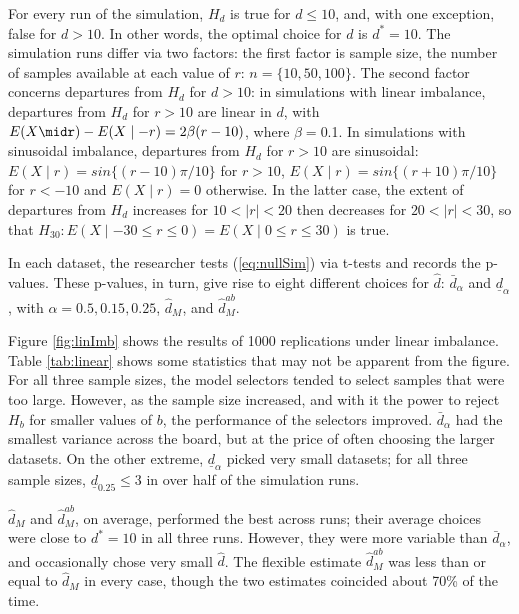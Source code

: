 \documentclass[lineno]{biometrika}\usepackage[]{graphicx}\usepackage[]{color}
\newcommand{\dalphaU}{\bar{d}_\alpha}
\newcommand{\dalphaB}{\underline{d}_\alpha}
\newcommand{\dstar}{d^*}
\newcommand{\dhatB}{\underline{d}}
\newcommand{\dhatm}{\hat{d}_M}
\newcommand{\dhatmab}{\hat{d}^{ab}_M}
\newcommand{\EE}{E}
\begin{document}
For every run of the simulation, $H_d$ is true for $d\le 10$, and,
with one exception, false for $d>10$.
In other words, the optimal choice for $d$ is $\dstar=10$.
The simulation runs differ via two factors: the first factor is sample
size, the number of samples available at each value of $r$:
$n=\{10,50,100\}$.
The second factor concerns departures from $H_d$ for $d>10$: in simulations with
linear imbalance, departures from $H_d$ for $r>10$ are linear in $d$, with $\EE
(X\midr)-\EE(X\mid-r)=2\beta(r-10)$, where $\beta=$0.1.
In simulations with sinusoidal imbalance, departures from $H_d$ for
$r>10$ are sinusoidal: $\EE(X\mid r) = sin\{(r-10)\pi/10\}$ for
$r>10$, $\EE(X\mid r)= sin\{(r+10)\pi/10\}$ for $r< -10$ and $\EE(X
\mid r)=0$ otherwise.
In the latter case, the extent of departures from $H_d$ increases for
$10<|r|<20$ then decreases for $20<|r|<30$, so that $H_{30}:\EE(X
\mid-30\le r \le 0)=\EE(X \mid 0\le r \le 30)$ is true.

In each dataset, the researcher tests (\ref{eq:nullSim}) via t-tests
and records the p-values.
These p-values, in turn, give rise to eight different choices for
$\hat{d}$: $\dalphaU$ and $\dalphaB$, with $\alpha=0.5,0.15,0.25$,
$\dhatm$, and $\dhatmab$.

Figure \ref{fig:linImb} shows the results of 1000 replications
under linear imbalance.
Table \ref{tab:linear} shows some statistics that may not be apparent
from the figure.
For all three sample sizes, the model selectors tended to select
samples that were too large.
However, as the sample size increased, and with it the power to reject
$H_b$ for smaller values of $b$, the performance of the selectors
improved.
$\dalphaU$ had the smallest
variance across the board, but at the
price of often choosing the larger datasets.
On the other extreme, $\dalphaB$ picked very small datasets; for all
three sample sizes, $\dhatB_{0.25}\le 3$ in over half of the
simulation runs.

$\dhatm$ and $\dhatmab$, on average, performed the best across
runs; their average choices were close to $\dstar=10$ in all three
runs.
However, they were more variable than $\dalphaU$, and occasionally
chose very small $\hat{d}$.
The flexible estimate $\dhatmab$ was less than or equal to $\dhatm$ in
every case, though the two estimates coincided about
70\% of the time.
\end{document}
